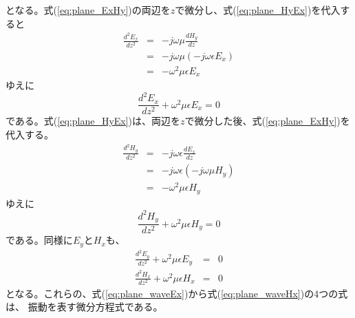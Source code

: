 となる。式(\ref{eq:plane_ExHy})の両辺を$z$で微分し、式(\ref{eq:plane_HyEx})を代入すると
\begin{eqnarray*}
\frac{d^2E_x}{dz^2} &=& -j\omega\mu \frac{dH_y}{dz} \nonumber\\
&=& -j\omega\mu (-j\omega\epsilon E_x) \nonumber\\
&=& -\omega^2\mu\epsilon E_x \nonumber
\end{eqnarray*}
ゆえに
\begin{equation}
\frac{d^2E_x}{dz^2} + \omega^2\mu\epsilon E_x = 0\label{eq:plane_waveEx}
\end{equation}
である。式(\ref{eq:plane_HyEx})は、両辺を$z$で微分した後、式(\ref{eq:plane_ExHy})を代入する。
\begin{eqnarray*}
\frac{d^2H_y}{dz^2} &=& -j\omega\epsilon\frac{dE_x}{dz} \nonumber \\
&=&-j\omega\epsilon(-j\omega\mu H_y) \nonumber\\
&=&-\omega^2\mu\epsilon H_y
\end{eqnarray*}
ゆえに
\begin{equation}
\frac{d^2H_y}{dz^2} + \omega^2\mu\epsilon H_y = 0\label{eq:plane_waveHy}
\end{equation}
である。同様に$E_y$と$H_x$も、
\begin{eqnarray}
\frac{d^2E_y}{dz^2} + \omega^2\mu\epsilon E_y &=& 0 \label{eq:plane_waveEy}\\
\frac{d^2H_x}{dz^2} + \omega^2\mu\epsilon H_x &=& 0\label{eq:plane_waveHx}
\end{eqnarray}
となる。これらの、式(\ref{eq:plane_waveEx})から式(\ref{eq:plane_waveHx})の4つの式は、
振動を表す微分方程式である。


